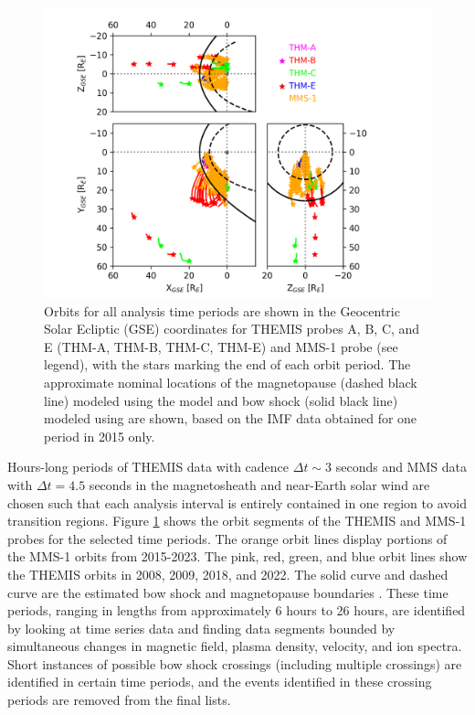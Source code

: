 \begin{figure}
    \centering
    \includegraphics[width=\textwidth]{Figures/Orbits/all_TE_orbits_xy_xz_yz.png}
    \caption[Orbits for all observation periods]{Orbits for all analysis time periods are shown in the Geocentric Solar Ecliptic (GSE) coordinates for THEMIS probes A, B, C, and E (THM-A, THM-B, THM-C, THM-E) and MMS-1 probe (see legend), with the stars marking the end of each orbit period. The approximate nominal locations of the magnetopause (dashed black line) modeled using the \cite{Shue:1997} model and bow shock (solid black line) modeled using \cite{SlavinHolzer:1984} are shown, based on the IMF data obtained for one period in 2015 only.}
    \label{fig:all-orbits-plot}
\end{figure}

Hours-long periods of THEMIS data with cadence $\Delta t\sim$3 seconds and MMS data with $\Delta t=4.5$ seconds in the magnetosheath and near-Earth solar wind are chosen such that each analysis interval is entirely contained in one region to avoid transition regions. Figure \ref{fig:all-orbits-plot} shows the orbit segments of the THEMIS and MMS-1 probes for the selected time periods. The orange orbit lines display portions of the MMS-1 orbits from 2015-2023. The pink, red, green, and blue orbit lines show the THEMIS orbits in 2008, 2009, 2018, and 2022. The solid curve and dashed curve are the estimated bow shock and magnetopause boundaries \citep{SlavinHolzer:1984,Shue:1997}. These time periods, ranging in lengths from approximately 6 hours to 26 hours, are identified by looking at time series data and finding data segments bounded by simultaneous changes in magnetic field, plasma density, velocity, and ion spectra. Short instances of possible bow shock crossings (including multiple crossings) are identified in certain time periods, and the events identified in these crossing periods are removed from the final lists.

